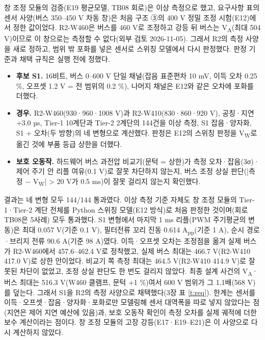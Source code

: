 창 조정 모듈의 검증(E19 평균모델, TB08 회로)은 이상 측정으로 했고, 요구사항 표의 센서 사양(버스 350–450 V 차동 창)은 처음 구조 ③의 400 V 정밀 조정 시험(E12)에서 정한 값이었다. R2-W460은 버스를 460 V로 조정하고 강등 뒤 버스는 V\textsubscript{A}(최대 504 V)이므로 이 창으로는 측정할 수 없다(외부 검토 2026-11-05). 그래서 R2의 측정 사양을 새로 정하고, 범위 밖 포화를 넣은 센서로 스위칭 모델에서 다시 판정했다. 판정 기준과 채택 규칙은 실행 전에 정했다.

\begin{itemize}
\item \textbf{후보 S1.} 16비트, 버스 0–600 V 단일 채널(잡음 표준편차 10 mV, 이득 오차 0.25 \%, 오프셋 1.2 V = 전 범위의 0.2 \%), 나머지 채널은 E12와 같은 오차에 포화를 더했다.
\item \textbf{경우.} R2-W460(930·960·1008 V)과 R2-W410(830·860·920 V), 공칭·지연 +3.0 µs, Tier-1 10계단과 Tier-2 2계단의 144건을 이상 측정, S1 잡음·양자화, S1 + 오차(두 방향)의 네 변형으로 계산했다. 판정은 E12의 스위칭 판정을 V\textsubscript{W}로 옮긴 것에 부품 등급 상한을 더했다.
\item \textbf{보호 오동작.} 하드웨어 버스 과전압 비교기(문턱 = 상한)가 측정 오차·잡음(3σ)·제어 주기 안 리플 여유(0.1 V)로 잘못 차단하지 않는지, 버스 조정 상실 판단(|측정 − V\textsubscript{W}| > 20 V가 0.5 ms)이 잘못 걸리지 않는지 확인했다.
\end{itemize}

결과는 네 변형 모두 144/144 통과였다. 이상 측정 기준 자체도 창 조정 모듈의 Tier-1·Tier-2 계단 전체를 Python 스위칭 모델(E12 방식)로 처음 판정한 것이며(회로 TB08은 5사례) 모두 통과했다. S1 변형에서 마지막 1 ms 리플(PWM 주기평균의 변동)은 최대 0.057 V(기준 0.1 V), 필터전류 꼬리 진동 0.614 A\textsubscript{pp}(기준 1 A), 순시 경로·브리지 전류 90.6 A(기준 98 A)였다. 이득·오프셋 오차는 조정점을 옮겨 실제 버스가 R2-W460에서 457.6–462.4 V로 정착했고, 실제 버스 최대는 466.7 V(R2-W410 417.0 V)로 상한 안이었다. 비교기 쪽 측정 최대는 464.5 V(R2-W410 414.9 V)로 잘못된 차단이 없었고, 조정 상실 판단도 한 번도 걸리지 않았다. 최종 설계 사건의 V\textsubscript{A}·버스 최대는 516.3 V(W460 클램프, 문턱 +1 \%)여서 600 V 범위가 그 1.1배(568 V)를 덮는다. 그래서 S1을 R2의 측정 사양으로 채택했다(3장 표 \ref{t:req}). 한계는 센서를 이득·오프셋·잡음·양자화·포화로만 모델링해 센서 대역폭을 따로 넣지 않았다는 점(지연은 제어 지연 예산에 있음)과, 보호 오동작 확인이 측정 오차를 실제 궤적에 더한 보수 계산이라는 점이다. 창 조정 모듈의 고장 강등(E17·E19–E21)은 이 사양으로 다시 계산하지 않았다.

